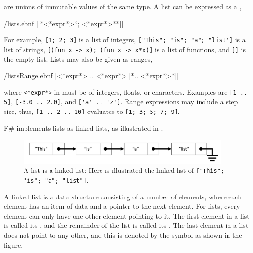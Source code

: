 \documentclass[fsharpNotes.tex]{subfiles}
\begin{document}
 are unions of immutable values of the same type. A list can be expressed as a ,
%
\begin{verbatimwrite}{\ebnf/lists.ebnf}
[[*<*expr*>{*; <*expr*>*}*]]
\end{verbatimwrite}
%
For example, \mbox{\lstinline![1; 2; 3]!} is a list of integers, \mbox{\lstinline!["This"; "is"; "a"; "list"]!} is a list of strings, \mbox{\lstinline![(fun x -> x); (fun x -> x*x)]!} is a list of functions, and \lstinline![]! is the empty list. Lists may also be given as ranges,
%
\begin{verbatimwrite}{\ebnf/listsRange.ebnf}
[<*expr*> .. <*expr*> [*.. <*expr*>*]]
\end{verbatimwrite}
%
where \lstinline[language=syntax]{<*expr*>} in  must be of integers, floats, or characters. Examples are \mbox{\lstinline![1 .. 5]!}, \mbox{\lstinline![-3.0 .. 2.0]!}, and \mbox{\lstinline!['a' .. 'z']!}. Range expressions may include a step size, thus, \mbox{\lstinline![1 .. 2 .. 10]!} evaluates to \mbox{\lstinline![1; 3; 5; 7; 9]!}.

F\# implements lists as linked lists, as illustrated in .
\begin{figure}
  \centering
  \includegraphics[width=0.95\textwidth]{linkedList}
  \caption{A list is a linked list: Here is illustrated the linked list of \mbox{\lstinline!["This"; "is"; "a"; "list"]!}.}
  \label{fig:linkedList}
\end{figure}
A linked list is a data structure consisting of a number of elements, where each element has an item of data and a pointer to the next element. For lists, every element can only have one other element pointing to it. The first element in a list is called its , and the remainder of the list is called its . The last element in a list does not point to any other, and this is denoted by the  symbol as shown in the figure. 
\end{document}
